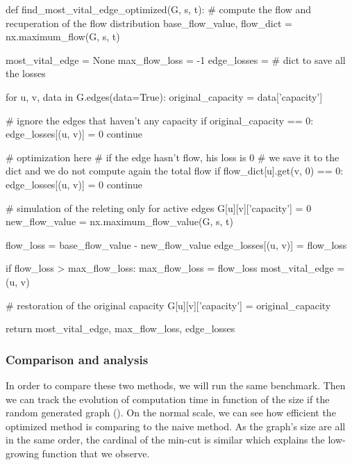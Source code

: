\documentclass[12pt, openany]{article}
\begin{document}
\begin{python}[caption={Python code for the naive approach in order to identify the most vital edge},  label={lst:2_naive_method_lst}]
def find_most_vital_edge_optimized(G, s, t):
    # compute the flow and recuperation of the flow distribution
    base_flow_value, flow_dict = nx.maximum_flow(G, s, t)
    
    most_vital_edge = None
    max_flow_loss = -1
    edge_losses = {} # dict to save all the losses
    
    for u, v, data in G.edges(data=True):
        original_capacity = data['capacity']
        
        # ignore the edges that haven't any capacity
        if original_capacity == 0: 
            edge_losses[(u, v)] = 0
            continue
            
        # optimization here
        # if the edge hasn't flow, his loss is 0
        # we save it to the dict and we do not compute again the total flow
        if flow_dict[u].get(v, 0) == 0:
            edge_losses[(u, v)] = 0
            continue
            
        # simulation of the releting only for active edges
        G[u][v]['capacity'] = 0
        new_flow_value = nx.maximum_flow_value(G, s, t)
        
        flow_loss = base_flow_value - new_flow_value
        edge_losses[(u, v)] = flow_loss
        
        if flow_loss > max_flow_loss:
            max_flow_loss = flow_loss
            most_vital_edge = (u, v)
            
        # restoration of the original capacity
        G[u][v]['capacity'] = original_capacity
        
    return most_vital_edge, max_flow_loss, edge_losses
\end{python}

\subsubsection{Comparison and analysis}

In order to compare these two methods, we will run the same benchmark.
Then we can track the evolution of computation time in function of the size if the random generated graph (). On the normal scale, we can see how efficient the optimized method is comparing to the naive method. As the graph's size are all in the same order, the cardinal of the min-cut is similar which explains the low-growing function that we observe.
\end{document}
